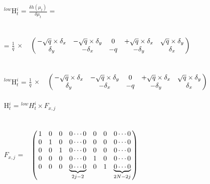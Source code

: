 \documentclass{ba-kecs}
\numberwithin{figure}{section}
\numberwithin{equation}{section}
\begin{document}
$^{low}$H$^{i}_{t}$ = $\frac{\delta h(\mu_{t})}{\delta{\mu_{t}}}$ = \\ \\ = $\frac{1}{q}$ $\times$ $\bordermatrix{~ \cr
                                & -\sqrt{q} \times \delta_{x} & -\sqrt{q} \times \delta_{y} & 0 & +\sqrt{q} \times \delta_{x} & \sqrt{q} \times \delta_{y} \cr
                                & \delta_{y} & -\delta_{x} & -q & -\delta_{y} & \delta_{x}} $\\ \\
                                                  
$^{low}$H$^{i}_{t}$ = $\frac{1}{q}$ $\times$ $\bordermatrix{~ \cr
                                & -\sqrt{q} \times \delta_{x} & -\sqrt{q} \times \delta_{y} & 0 & +\sqrt{q} \times \delta_{x} & \sqrt{q} \times \delta_{y} \cr
                                & \delta_{y} & -\delta_{x} & -q & -\delta_{y} & \delta_{x}} $\\ \\
                                                  
H$^{i}_{t}$ = $^{low}H^{i}_{t} \times F_{x,j}$
\\ \\
$F_{x,j}$ = $\bordermatrix{~ \cr
                        & 1 & 0 & 0 & 0 \cdots 0 & 0 & 0 & 0 \cdots 0 \cr
                        & 0 & 1 & 0 & 0 \cdots 0 & 0 & 0 & 0 \cdots 0 \cr
                        & 0 & 0 & 1 & 0 \cdots 0 & 0 & 0 & 0 \cdots 0 \cr
                        & 0 & 0 & 0 & 0 \cdots 0 & 1 & 0 & 0 \cdots 0 \cr
                        & 0 & 0 & 0 & \underbrace{0 \cdots 0}_{2j-2} & 0 & 1 & \underbrace{0 \cdots 0}_{2N-2j} \cr}$
\end{document}
